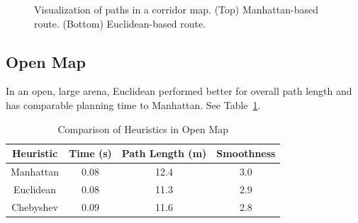 \documentclass[letterpaper, 10 pt, conference]{ieeeconf}
\begin{document}
\begin{figure}[!ht]
    \centering
    \caption{Visualization of paths in a corridor map. 
    (Top) Manhattan-based route. (Bottom) Euclidean-based route.}
    \label{fig:maze_vis}
\end{figure}

\subsection{Open Map}
In an open, large arena, Euclidean performed better for overall path length 
and has comparable planning time to Manhattan. See Table~\ref{table:open}.

\begin{table}[!ht]
\centering
\footnotesize
\caption{Comparison of Heuristics in Open Map}
\label{table:open}
\begin{tabular}{|c|c|c|c|}
\hline
\textbf{Heuristic} & \textbf{Time (s)} & \textbf{Path Length (m)} & \textbf{Smoothness}\\
\hline
Manhattan & 0.08 & 12.4 & 3.0 \\
Euclidean & 0.08 & 11.3 & 2.9 \\
Chebyshev & 0.09 & 11.6 & 2.8 \\
\hline
\end{tabular}
\end{table}
\end{document}
